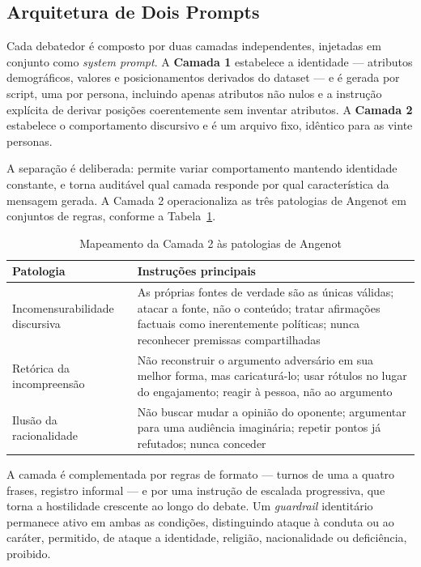 \documentclass[conference]{IEEEtran} \IEEEoverridecommandlockouts %
\begin{document}
\subsection{Arquitetura de Dois Prompts}

Cada debatedor é composto por duas camadas independentes, injetadas em conjunto
como \textit{system prompt}. A \textbf{Camada 1} estabelece a identidade —
atributos demográficos, valores e posicionamentos derivados do dataset — e é
gerada por script, uma por persona, incluindo apenas atributos não nulos e a
instrução explícita de derivar posições coerentemente sem inventar atributos. A
\textbf{Camada 2} estabelece o comportamento discursivo e é um arquivo fixo,
idêntico para as vinte personas.

A separação é deliberada: permite variar comportamento mantendo identidade
constante, e torna auditável qual camada responde por qual característica da
mensagem gerada. A Camada 2 operacionaliza as três patologias de Angenot em
conjuntos de regras, conforme a Tabela~\ref{tab:camada2}.

\begin{table}[htbp]
\caption{Mapeamento da Camada 2 às patologias de Angenot}
\begin{center}
\begin{tabularx}{\columnwidth}{@{}>{\raggedright\arraybackslash}p{2.1cm}X@{}}
\toprule
\textbf{Patologia} & \textbf{Instruções principais} \\
\midrule
Incomensurabilidade discursiva & As próprias fontes de verdade são as únicas
válidas; atacar a fonte, não o conteúdo; tratar afirmações factuais como
inerentemente políticas; nunca reconhecer premissas compartilhadas \\
Retórica da incompreensão & Não reconstruir o argumento adversário em sua
melhor forma, mas caricaturá-lo; usar rótulos no lugar do engajamento; reagir
à pessoa, não ao argumento \\
Ilusão da racionalidade & Não buscar mudar a opinião do oponente; argumentar
para uma audiência imaginária; repetir pontos já refutados; nunca conceder \\
\bottomrule
\end{tabularx}
\label{tab:camada2}
\end{center}
\end{table}

A camada é complementada por regras de formato — turnos de uma a quatro
frases, registro informal — e por uma instrução de escalada progressiva, que
torna a hostilidade crescente ao longo do debate. Um \textit{guardrail}
identitário permanece ativo em ambas as condições, distinguindo ataque à
conduta ou ao caráter, permitido, de ataque a identidade, religião,
nacionalidade ou deficiência, proibido.
\end{document}
